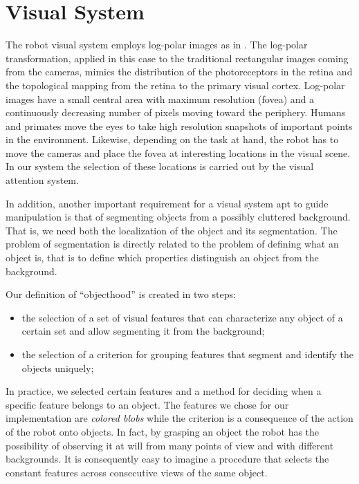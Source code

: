 \section{Visual System}
\label{sect:vision}

The robot visual system employs log-polar images as in \cite{sandini80retinalike}. The log-polar transformation, applied in this case to the traditional rectangular images coming from the cameras, mimics the distribution of the photoreceptors in the retina and the topological mapping from the retina to the primary visual cortex. Log-polar images have a small central area with maximum resolution (fovea) and a continuously decreasing number of pixels moving toward the periphery. 
Humans and primates move the eyes to take high resolution snapshots of important points in the environment. Likewise, depending on the task at hand, the robot has to move the cameras and place the fovea at interesting locations in the visual scene. In our system the selection of these locations is carried out by the visual attention system.

In addition, another important requirement for a visual system apt to guide manipulation is that of segmenting objects from a possibly cluttered background. That is, we need both the localization of the object and its segmentation. The problem of segmentation is directly related to the problem of defining what an object is, that is to define which properties distinguish an object from the background.

Our definition of ``objecthood'' is created in two steps:
\begin{itemize}
\item the selection of a set of visual features that can characterize any object of a certain set and allow segmenting it from the background;
\item the selection of a criterion for grouping features that segment and identify the objects uniquely;
\end{itemize}
\noindent In practice, we selected certain features and a method for deciding when a specific feature belongs to an object. The features we chose for our implementation are {\em colored blobs} while the criterion is a consequence of the action of the robot onto objects. In fact, by grasping an object the robot has the possibility of observing it at will from many points of view and with different backgrounds. It is consequently easy to imagine a procedure that selects the constant features across consecutive views of the same object.

